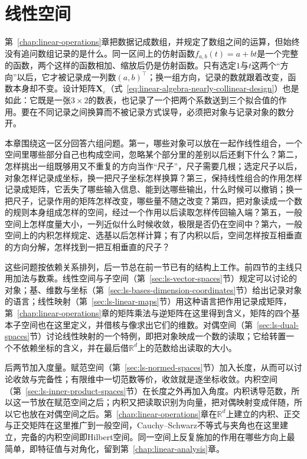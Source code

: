 \chapter{线性空间}
\label{chap:linear-representation}
\label{chap:linear-algebra-and-matrix-analysis}
\label{chap:linear-algebra}

第~\ref{chap:linear-operations}章把数据记成数组，并规定了数组之间的运算，但始终没有追问数组记录的是什么。同一区间上的仿射函数$f_{a,b}(t)=a+bt$是一个完整的函数，两个这样的函数相加、缩放后仍是仿射函数。只有选定$1$与$t$这两个“方向”以后，它才被记录成一列数$(a,b)^{\top}$；换一组方向，记录的数就跟着改变，函数本身却不变。设计矩阵$\bm X_\varepsilon$（式~\eqref{eq:linear-algebra-nearly-collinear-design}）也是如此：它既是一张$3\times2$的数表，也记录了一个把两个系数送到三个拟合值的作用。要在不同记录之间换算而不被记录方式误导，必须把对象与记录对象的数分开。

本章围绕这一区分回答六组问题。第一，哪些对象可以放在一起作线性组合，一个空间里哪些部分自己也构成空间，忽略某个部分里的差别以后还剩下什么？第二，怎样挑出一组既够用又不重复的方向当作“尺子”，尺子需要几根；选定尺子以后，对象怎样记录成坐标，换一把尺子坐标怎样换算？第三，保持线性组合的作用怎样记录成矩阵，它丢失了哪些输入信息、能到达哪些输出，什么时候可以撤销；换一把尺子，记录作用的矩阵怎样改变，哪些量不随之改变？第四，把对象读成一个数的规则本身组成怎样的空间，经过一个作用以后读取怎样传回输入端？第五，一般空间上怎样度量大小，一列近似什么时候收敛，极限是否仍在空间中？第六，一般空间上的内积怎样规定、选基以后怎样计算；有了内积以后，空间怎样按互相垂直的方向分解，怎样找到一把互相垂直的尺子？

这些问题按依赖关系排列，后一节总在前一节已有的结构上工作。前四节的主线只用加法与数乘。线性空间与子空间（第~\ref{sec:ls-vector-spaces}节）规定可以讨论的对象；基、维数与坐标（第~\ref{sec:ls-bases-dimension-coordinates}节）给出记录对象的语言；线性映射（第~\ref{sec:ls-linear-maps}节）用这种语言把作用记录成矩阵，第~\ref{chap:linear-operations}章的矩阵乘法与逆矩阵在这里得到含义，矩阵的四个基本子空间也在这里定义，并借核与像求出它们的维数。对偶空间（第~\ref{sec:ls-dual-spaces}节）讨论线性映射的一个特例，即把对象映成一个数的读取；它给转置一个不依赖坐标的含义，并在最后借$\mathbb R^d$上的范数给出读取的大小。

后两节加入度量。赋范空间（第~\ref{sec:ls-normed-spaces}节）加入长度，从而可以讨论收敛与完备性；有限维中一切范数等价，收敛就是逐坐标收敛。内积空间（第~\ref{sec:ls-inner-product-spaces}节）在长度之外再加入角度。内积诱导范数，所以这一节放在赋范空间之后；内积又把读取识别为向量，把对偶映射变成伴随，所以它也放在对偶空间之后。第~\ref{chap:linear-operations}章在$\mathbb R^d$上建立的内积、正交与正交矩阵在这里推广到一般空间，Cauchy--Schwarz不等式与夹角也在这里建立，完备的内积空间即Hilbert空间。同一空间上反复施加的作用在哪些方向上最简单，即特征值与对角化，留到第~\ref{chap:linear-analysis}章。

